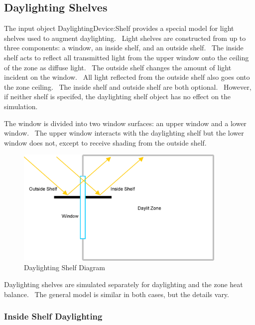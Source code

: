 \subsection{Daylighting Shelves}\label{daylighting-shelves}

The input object DaylightingDevice:Shelf provides a special model for light shelves used to augment daylighting.~ Light shelves are constructed from up to three components: a window, an inside shelf, and an outside shelf.~ The inside shelf acts to reflect all transmitted light from the upper window onto the ceiling of the zone as diffuse light.~ The outside shelf changes the amount of light incident on the window.~ All light reflected from the outside shelf also goes onto the zone ceiling.~ The inside shelf and outside shelf are both optional.~ However, if neither shelf is specifed, the daylighting shelf object has no effect on the simulation.

The window is divided into two window surfaces: an upper window and a lower window.~ The upper window interacts with the daylighting shelf but the lower window does not, except to receive shading from the outside shelf.

\begin{figure}[hbtp] %
\centering
\includegraphics[width=0.9\textwidth, height=0.9\textheight, keepaspectratio=true]{media/image893.png}
\caption{Daylighting Shelf Diagram \protect \label{fig:daylighting-shelf-diagram}}
\end{figure}

Daylighting shelves are simulated separately for daylighting and the zone heat balance.~ The general model is similar in both cases, but the details vary.

\subsubsection{Inside Shelf Daylighting}\label{inside-shelf-daylighting}

